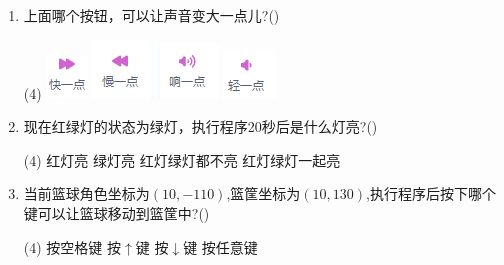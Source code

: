 \documentclass[10pt, a4paper]{article}
\begin{document}
\begin{enumerate}
        \item 上面哪个按钮，可以让声音变大一点儿?(\qquad)
        \begin{tasks}(4)
            \task \includegraphics[width=.05\textwidth]{7a.png}
            \task \includegraphics[width=.06\textwidth]{7b.png}
            \task \includegraphics[width=.06\textwidth]{7c.png}
            \task \includegraphics[width=.06\textwidth]{7d.png}
        \end{tasks}

        \newpage
       \item 现在红绿灯的状态为绿灯，执行程序20秒后是什么灯亮?(\qquad)
       \begin{tasks}(4)
           \task 红灯亮
           \task 绿灯亮
           \task 红灯绿灯都不亮
           \task 红灯绿灯一起亮
       \end{tasks}

        \item 当前篮球角色坐标为$(10,-110)$,篮筐坐标为$(10,130)$,执行程序后按下哪个键可以让篮球移动到篮筐中?(\qquad)
        \begin{tasks}(4)
            \task 按空格键
            \task 按$\uparrow$键
            \task 按$\downarrow$键
            \task 按任意键
        \end{tasks}


\end{enumerate}
\end{document}
